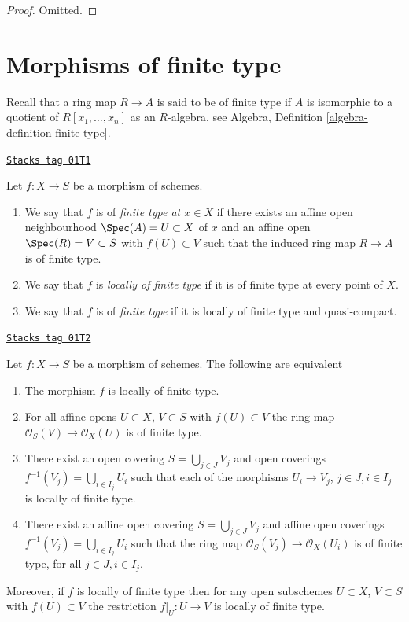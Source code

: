 \begin{proof}
Omitted.
\end{proof}

\section{Morphisms of finite type}
\label{morphisms-section-finite-type}
Recall that a ring map $R \to A$ is said to be of finite type if
$A$ is isomorphic to a quotient of $R[x_1, \ldots, x_n]$ as an $R$-algebra, see
Algebra, Definition \ref{algebra-definition-finite-type}.

\begin{definition}
\label{morphisms-definition-finite-type}
\href{https://stacks.math.columbia.edu/tag/01T1}{\texttt{Stacks tag 01T1}}

Let $f : X \to S$ be a morphism of schemes.
\begin{enumerate}
\item We say that $f$ is of {\it finite type at $x \in X$} if
there exists an affine open neighbourhood $\Spec(A) = U \subset X$
of $x$ and an affine open $\Spec(R) = V \subset S$
with $f(U) \subset V$ such that the induced ring map
$R \to A$ is of finite type.
\item We say that $f$ is {\it locally of finite type} if it is
of finite type at every point of $X$.
\item We say that $f$ is of {\it finite type} if it is locally of
finite type and quasi-compact.
\end{enumerate}
\end{definition}

\begin{lemma}
\label{morphisms-lemma-locally-finite-type-characterize}
\href{https://stacks.math.columbia.edu/tag/01T2}{\texttt{Stacks tag 01T2}}

Let $f : X \to S$ be a morphism of schemes.
The following are equivalent
\begin{enumerate}
\item The morphism $f$ is locally of finite type.
\item For all affine opens $U \subset X$, $V \subset S$
with $f(U) \subset V$ the ring map
$\mathcal{O}_S(V) \to \mathcal{O}_X(U)$ is of finite type.
\item There exist an open covering $S = \bigcup_{j \in J} V_j$
and open coverings $f^{-1}(V_j) = \bigcup_{i \in I_j} U_i$ such
that each of the morphisms $U_i \to V_j$, $j\in J, i\in I_j$
is locally of finite type.
\item There exist an affine open covering $S = \bigcup_{j \in J} V_j$
and affine open coverings $f^{-1}(V_j) = \bigcup_{i \in I_j} U_i$ such
that the ring map $\mathcal{O}_S(V_j) \to \mathcal{O}_X(U_i)$ is
of finite type, for all $j\in J, i\in I_j$.
\end{enumerate}
Moreover, if $f$ is locally of finite type then for
any open subschemes $U \subset X$, $V \subset S$ with $f(U) \subset V$
the restriction $f|_U : U \to V$ is locally of finite type.
\end{lemma}


